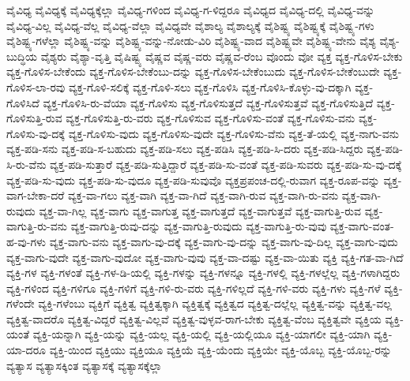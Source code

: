 {ವೈವಿಧ್ಯ
ವೈವಿಧ್ಯಕ್ಕೆ
ವೈವಿಧ್ಯಕ್ಕೆಲ್ಲಾ
ವೈವಿಧ್ಯ-ಗಳಿಂದ
ವೈವಿಧ್ಯ-ಗ-ಳಿದ್ದರೂ
ವೈವಿಧ್ಯದ
ವೈವಿಧ್ಯ-ದಲ್ಲಿ
ವೈವಿಧ್ಯ-ವನ್ನು
ವೈವಿಧ್ಯ-ವಿಲ್ಲ
ವೈವಿಧ್ಯ-ವೆಲ್ಲ
ವೈವಿಧ್ಯ-ವೆಲ್ಲಾ
ವೈವಿಧ್ಯವೇ
ವೈಶಾಲ್ಯ
ವೈಶಾಲ್ಯಕ್ಕೆ
ವೈಶಿಷ್ಟ್ಯ
ವೈಶಿಷ್ಟ್ಯಕ್ಕೆ
ವೈಶಿಷ್ಟ್ಯ-ಗಳು
ವೈಶಿಷ್ಟ್ಯ-ಗಳೆಲ್ಲಾ
ವೈಶಿಷ್ಟ್ಯ-ವನ್ನು
ವೈಶಿಷ್ಟ್ಯ-ವನ್ನು-ನೋಡು-ವಿರಿ
ವೈಶಿಷ್ಟ್ಯ-ವಾದ
ವೈಶಿಷ್ಟ್ಯವೇ
ವೈಶಿಷ್ಟ್ಯ-ವೇನು
ವೈಶ್ಯ
ವೈಶ್ಯ-ಬುದ್ಧಿಯ
ವೈಶ್ಯರು
ವೈಶ್ಯಾ-ವೃತ್ತಿ
ವೈಷಿಷ್ಟ್ಯ
ವೈಷ್ಣವ
ವೈಷ್ಣ-ವರು
ವೈಷ್ಣವ-ರೆಂಬ
ವೊಂದು
ವೋ
ವ್ಯಕ್ತ
ವ್ಯಕ್ತ-ಗೊಳಿಸ-ಬೇಕು
ವ್ಯಕ್ತ-ಗೊಳಿಸ-ಬೇಕೆಂದು
ವ್ಯಕ್ತ-ಗೊಳಿಸ-ಬೇಕೆಂಬು-ದನ್ನು
ವ್ಯಕ್ತ-ಗೊಳಿಸ-ಬೇಕೆಂಬುದು
ವ್ಯಕ್ತ-ಗೊಳಿಸ-ಬೇಕೆಂಬುದೇ
ವ್ಯಕ್ತ-ಗೊಳಿಸ-ಲಾ-ರವು
ವ್ಯಕ್ತ-ಗೊಳಿ-ಸಲಿಕ್ಕೆ
ವ್ಯಕ್ತ-ಗೊಳಿ-ಸಲು
ವ್ಯಕ್ತ-ಗೊಳಿಸಿ
ವ್ಯಕ್ತ-ಗೊಳಿಸಿ-ಕೊಳ್ಳು-ವು-ದಕ್ಕಾಗಿ
ವ್ಯಕ್ತ-ಗೊಳಿಸಿದೆ
ವ್ಯಕ್ತ-ಗೊಳಿಸಿ-ರು-ವೆಯಾ
ವ್ಯಕ್ತ-ಗೊಳಿಸು
ವ್ಯಕ್ತ-ಗೊಳಿಸುತ್ತದೆ
ವ್ಯಕ್ತ-ಗೊಳಿಸುತ್ತವೆ
ವ್ಯಕ್ತ-ಗೊಳಿಸುತ್ತಿದೆ
ವ್ಯಕ್ತ-ಗೊಳಿಸುತ್ತಿ-ರುವ
ವ್ಯಕ್ತ-ಗೊಳಿಸುತ್ತಿ-ರು-ವರು
ವ್ಯಕ್ತ-ಗೊಳಿಸುವ
ವ್ಯಕ್ತ-ಗೊಳಿಸು-ವಂತೆ
ವ್ಯಕ್ತ-ಗೊಳಿಸು-ವನು
ವ್ಯಕ್ತ-ಗೊಳಿಸು-ವು-ದಕ್ಕೆ
ವ್ಯಕ್ತ-ಗೊಳಿಸು-ವುದು
ವ್ಯಕ್ತ-ಗೊಳಿಸು-ವುದೇ
ವ್ಯಕ್ತ-ಗೊಳಿಸು-ವೆನು
ವ್ಯಕ್ತ-ತೆ-ಯಲ್ಲಿ
ವ್ಯಕ್ತ-ನಾಗು-ವನು
ವ್ಯಕ್ತ-ಪಡಿ-ಸನು
ವ್ಯಕ್ತ-ಪಡಿ-ಸ-ಬಹುದು
ವ್ಯಕ್ತ-ಪಡಿ-ಸಲು
ವ್ಯಕ್ತ-ಪಡಿಸಿ
ವ್ಯಕ್ತ-ಪಡಿ-ಸಿ-ದರು
ವ್ಯಕ್ತ-ಪಡಿ-ಸಿದ್ದರು
ವ್ಯಕ್ತ-ಪಡಿ-ಸಿ-ರು-ವೆನು
ವ್ಯಕ್ತ-ಪಡಿ-ಸುತ್ತಾರೆ
ವ್ಯಕ್ತ-ಪಡಿ-ಸುತ್ತಿದ್ದಾರೆ
ವ್ಯಕ್ತ-ಪಡಿ-ಸು-ವಂತೆ
ವ್ಯಕ್ತ-ಪಡಿ-ಸುವರು
ವ್ಯಕ್ತ-ಪಡಿ-ಸು-ವು-ದಕ್ಕೆ
ವ್ಯಕ್ತ-ಪಡಿ-ಸು-ವುದು
ವ್ಯಕ್ತ-ಪಡಿ-ಸು-ವುದೂ
ವ್ಯಕ್ತ-ಪಡಿ-ಸುವುವೊ
ವ್ಯಕ್ತಪ್ರಪಂಚ-ದಲ್ಲಿ-ರುವಾಗ
ವ್ಯಕ್ತ-ರೂಪ-ವನ್ನು
ವ್ಯಕ್ತ-ವಾಗ-ಬೇಕಾ-ದರೆ
ವ್ಯಕ್ತ-ವಾ-ಗಲು
ವ್ಯಕ್ತ-ವಾಗಿ
ವ್ಯಕ್ತ-ವಾ-ಗಿದೆ
ವ್ಯಕ್ತ-ವಾಗಿ-ರುವ
ವ್ಯಕ್ತ-ವಾಗಿ-ರು-ವನು
ವ್ಯಕ್ತ-ವಾಗಿ-ರುವುದು
ವ್ಯಕ್ತ-ವಾ-ಗಿಲ್ಲ
ವ್ಯಕ್ತ-ವಾಗು
ವ್ಯಕ್ತ-ವಾಗುತ್ತ
ವ್ಯಕ್ತ-ವಾಗುತ್ತದೆ
ವ್ಯಕ್ತ-ವಾಗುತ್ತವೆ
ವ್ಯಕ್ತ-ವಾಗುತ್ತಿ-ರುವ
ವ್ಯಕ್ತ-ವಾಗುತ್ತಿ-ರು-ವನು
ವ್ಯಕ್ತ-ವಾಗುತ್ತಿ-ರುವು-ದನ್ನು
ವ್ಯಕ್ತ-ವಾಗುತ್ತಿ-ರುವುದು
ವ್ಯಕ್ತ-ವಾಗುತ್ತಿ-ರು-ವುವು
ವ್ಯಕ್ತ-ವಾಗು-ವಂತ-ಹ-ವು-ಗಳು
ವ್ಯಕ್ತ-ವಾಗು-ವನು
ವ್ಯಕ್ತ-ವಾಗು-ವು-ದಕ್ಕೆ
ವ್ಯಕ್ತ-ವಾಗು-ವು-ದನ್ನು
ವ್ಯಕ್ತ-ವಾಗು-ವು-ದಿಲ್ಲ
ವ್ಯಕ್ತ-ವಾಗು-ವುದು
ವ್ಯಕ್ತ-ವಾಗು-ವುದೇ
ವ್ಯಕ್ತ-ವಾಗು-ವುದೋ
ವ್ಯಕ್ತ-ವಾಗು-ವುವು
ವ್ಯಕ್ತ-ವಾ-ದಷ್ಟು
ವ್ಯಕ್ತ-ವಾ-ಯಿತು
ವ್ಯಕ್ತಿ
ವ್ಯಕ್ತಿ-ಗತ-ವಾ-ಗಿದೆ
ವ್ಯಕ್ತಿ-ಗಳ
ವ್ಯಕ್ತಿ-ಗಳಂತೆ
ವ್ಯಕ್ತಿ-ಗಳ-ಡಿ-ಯಲ್ಲಿ
ವ್ಯಕ್ತಿ-ಗಳನ್ನು
ವ್ಯಕ್ತಿ-ಗಳನ್ನೂ
ವ್ಯಕ್ತಿ-ಗಳಲ್ಲಿ
ವ್ಯಕ್ತಿ-ಗಳಲ್ಲೆಲ್ಲ
ವ್ಯಕ್ತಿ-ಗಳಾಗಿದ್ದರು
ವ್ಯಕ್ತಿ-ಗಳಿಂದ
ವ್ಯಕ್ತಿ-ಗಳಿಗೂ
ವ್ಯಕ್ತಿ-ಗಳಿಗೆ
ವ್ಯಕ್ತಿ-ಗಳಿ-ರು-ವರು
ವ್ಯಕ್ತಿ-ಗಳಿಲ್ಲದೆ
ವ್ಯಕ್ತಿ-ಗಳಿ-ವರು
ವ್ಯಕ್ತಿ-ಗಳು
ವ್ಯಕ್ತಿ-ಗಳೆ
ವ್ಯಕ್ತಿ-ಗಳೆಂದೇ
ವ್ಯಕ್ತಿ-ಗಳೆಂಬು
ವ್ಯಕ್ತಿಗೆ
ವ್ಯಕ್ತಿತ್ವ
ವ್ಯಕ್ತಿತ್ವಕ್ಕಾಗಿ
ವ್ಯಕ್ತಿತ್ವಕ್ಕೆ
ವ್ಯಕ್ತಿತ್ವದ
ವ್ಯಕ್ತಿತ್ವ-ದಲ್ಲೆಲ್ಲ
ವ್ಯಕ್ತಿತ್ವ-ವನ್ನು
ವ್ಯಕ್ತಿತ್ವ-ವಲ್ಲ
ವ್ಯಕ್ತಿತ್ವ-ವಾದರೊ
ವ್ಯಕ್ತಿತ್ವ-ವಿದ್ದರೆ
ವ್ಯಕ್ತಿತ್ವ-ವಿಲ್ಲವೆ
ವ್ಯಕ್ತಿತ್ವ-ವುಳ್ಳವ-ರಾಗ-ಬೇಕು
ವ್ಯಕ್ತಿತ್ವ-ವೆಂಬ
ವ್ಯಕ್ತಿತ್ವವೇ
ವ್ಯಕ್ತಿಯ
ವ್ಯಕ್ತಿ-ಯಂತೆ
ವ್ಯಕ್ತಿ-ಯನ್ನಾಗಿ
ವ್ಯಕ್ತಿ-ಯನ್ನು
ವ್ಯಕ್ತಿ-ಯಲ್ಲ
ವ್ಯಕ್ತಿ-ಯಲ್ಲಿ
ವ್ಯಕ್ತಿ-ಯಲ್ಲಿಯೂ
ವ್ಯಕ್ತಿ-ಯಾಗಲೀ
ವ್ಯಕ್ತಿ-ಯಾಗಿ
ವ್ಯಕ್ತಿ-ಯಾ-ದರೂ
ವ್ಯಕ್ತಿ-ಯಿಂದ
ವ್ಯಕ್ತಿಯು
ವ್ಯಕ್ತಿಯೂ
ವ್ಯಕ್ತಿಯೆ
ವ್ಯಕ್ತಿ-ಯೆಂದು
ವ್ಯಕ್ತಿಯೇ
ವ್ಯಕ್ತಿ-ಯೊಬ್ಬ
ವ್ಯಕ್ತಿ-ಯೊಬ್ಬ-ರನ್ನು
ವ್ಯತ್ಯಾಸ
ವ್ಯತ್ಯಾಸಕ್ಕಿಂತ
ವ್ಯತ್ಯಾಸಕ್ಕೆ
ವ್ಯತ್ಯಾಸಕ್ಕೆಲ್ಲಾ
}
